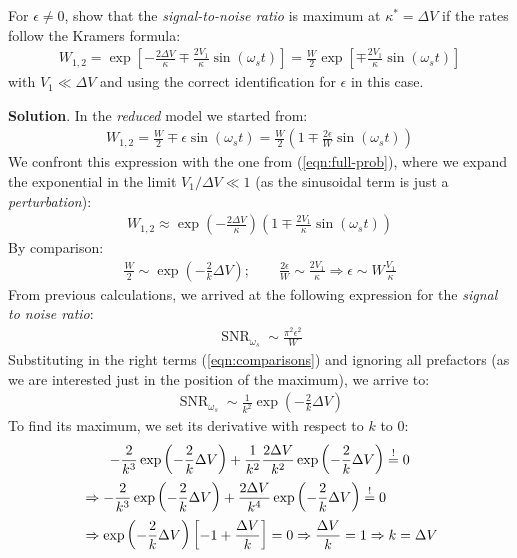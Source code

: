 \documentclass[../template.tex]{subfiles}
\begin{document}
\begin{exo}
    For $\epsilon \neq 0$, show that the \textit{signal-to-noise ratio} is maximum at $\kappa^* = \Delta V$ if the rates follow the Kramers formula:
    \begin{align} \label{eqn:full-prob}
        W_{1,2} = \exp\left[-\frac{2 \Delta V}{\kappa} \mp \frac{2V_1}{\kappa} \sin(\omega_s t)  \right] = \frac{W}{2} \exp\left[\mp \frac{2V_1}{\kappa} \sin(\omega_s t) \right] 
    \end{align} 
    with $V_1 \ll \Delta V$ and using the correct identification for $\epsilon$ in this case.

    \medskip

    \textbf{Solution}. 
    In the \textit{reduced} model we started from:
    \begin{align} \label{eqn:reduced-prob}
        W_{1,2} = \frac{W}{2} \mp \epsilon \sin(\omega_s t) = \frac{W}{2} \left(1 \mp \frac{2\epsilon}{W} \sin(\omega_s t) \right)  
    \end{align}
    We confront this expression with the one from (\ref{eqn:full-prob}), where we expand the exponential in the limit $V_1 / \Delta V \ll 1$ (as the sinusoidal term is just a \textit{perturbation}):
    \begin{align*}
        W_{1,2} \approx \exp\left(-\frac{2\Delta V}{\kappa} \right) \left(1\mp \frac{2V_1}{\kappa} \sin(\omega_s t)\right)
    \end{align*}
    By comparison:
    \begin{align}
        \frac{W}{2} \sim \exp\left(-\frac{2}{k} \Delta V \right); \qquad \frac{2 \epsilon}{W} \sim \frac{2V_1}{\kappa} \Rightarrow \epsilon \sim W \frac{V_1}{\kappa}    \label{eqn:comparisons}
    \end{align}
    From previous calculations, we arrived at the following expression for the \textit{signal to noise ratio}:
    \begin{align*}
        \operatorname{SNR}_{\omega_s} \sim \frac{\pi^2 \epsilon^2}{W} 
    \end{align*} 
    Substituting in the right terms (\ref{eqn:comparisons}) and ignoring all prefactors (as we are interested just in the position of the maximum), we arrive to:
    \begin{align*}
        \operatorname{SNR}_{\omega_s} \sim \frac{1}{k^2} \exp\left(-\frac{2}{k} \Delta V\right)  
    \end{align*} 
    To find its maximum, we set its derivative with respect to $k$ to $0$:
    \begin{align*}
        -\frac{2}{k^3} \exp\left(-\frac{2}{k} \Delta V \right) +\frac{1}{k^2}\frac{2\Delta V}{k^2} \exp\left(-\frac{2}{k} \Delta V \right)  \overset{!}{=} 0 \span\\
        &\Rightarrow -\frac{2}{k^3} \exp\left(-\frac{2}{k} \Delta V \right)  + \frac{2 \Delta V}{k^4}  \exp\left(-\frac{2}{k} \Delta V \right) \overset{!}{=} 0\\
        &\Rightarrow \exp\left(-\frac{2}{k} \Delta V \right) \left[-1 + \frac{\Delta V}{k} \right] = 0 \Rightarrow \frac{\Delta V}{k} = 1 \Rightarrow k = \Delta V 
    \end{align*}
\end{exo}
\end{document}
